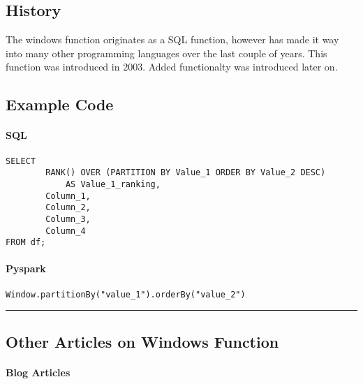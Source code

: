 \documentclass[
  letterpaper,
  DIV=11,
  numbers=noendperiod]{scrartcl}
\let\oldparagraph\paragraph
\renewcommand{\paragraph}[1]{\oldparagraph{#1}\mbox{}}
\begin{document}
\hypertarget{history}{%
\subsection{History}\label{history}}

The windows function originates as a SQL function, however has made it
way into many other programming languages over the last couple of years.
This function was introduced in 2003. Added functionalty was introduced
later on.

\hypertarget{example-code}{%
\subsection{Example Code}\label{example-code}}

\hypertarget{sql}{%
\paragraph{SQL}\label{sql}}

\begin{verbatim}
SELECT  
        RANK() OVER (PARTITION BY Value_1 ORDER BY Value_2 DESC) 
            AS Value_1_ranking,
        Column_1,
        Column_2, 
        Column_3, 
        Column_4
FROM df;
\end{verbatim}

\hypertarget{pyspark}{%
\paragraph{Pyspark}\label{pyspark}}

\begin{verbatim}
Window.partitionBy("value_1").orderBy("value_2")
\end{verbatim}

\begin{center}\rule{0.5\linewidth}{0.5pt}\end{center}

\hypertarget{other-articles-on-windows-function}{%
\subsection{Other Articles on Windows
Function}\label{other-articles-on-windows-function}}

\hypertarget{blog-articles}{%
\paragraph{Blog Articles}\label{blog-articles}}
\end{document}
